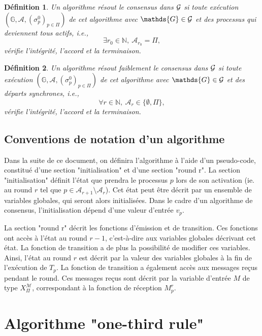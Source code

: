 \documentclass{article}
\newtheorem{definition}{Définition}
\begin{document}
\begin{definition}\label{def:res}
	Un algorithme \emph{résout  le consensus dans ${\cal G}$} si toute exécution 
	$( \mathds{G} ,  \mathcal{A} , (\sigma^0_p)_{p \in \Pi})$     de cet algorithme  avec
	$ \mathds{G} \in {\cal G}$  et des processus qui deviennent tous actifs, i.e., 
	$$ \exists r_0 \in \mathds{N}, \  \mathcal{A}_{r_0}  = \Pi ,$$ 
	vérifie l'intégrité, l'accord et la terminaison.
\end{definition}

\begin{definition}\label{def:faible}
	Un algorithme \emph{résout faiblement le consensus dans ${\cal G}$} si toute exécution 
	$( \mathds{G} ,  \mathcal{A} , (\sigma^0_p)_{p \in \Pi})$     de cet algorithme  avec
	$ \mathds{G} \in {\cal G}$  et des d\'eparts synchrones, i.e., 
	$$ \forall r \in \mathds{N}, \  \mathcal{A}_r \in \{\emptyset, \Pi\}  ,$$ 
	vérifie l'intégrité, l'accord et la terminaison.
\end{definition}

\subsection{Conventions de notation d'un algorithme}

Dans la suite de ce document, on définira l'algorithme à l'aide d'un pseudo-code, constitué d'une section "initialisation" et d'une section "round r".
La section "initialisation" définit l'état que prendra le processus $p$ lors de son activation
(ie. au round $r$ tel que $p \in \mathcal{A}_{r+1} \setminus \mathcal{A}_r$).
Cet état peut être décrit par un ensemble de variables globales, qui seront alors initialisées.
Dans le cadre d'un algorithme de consensus, l'initialisation dépend d'une valeur d'entrée $v_p$.

La section "round r" décrit les fonctions d'émission et de transition. Ces fonctions ont accès à l'état au round $r-1$, c'est-à-dire aux
variables globales décrivant cet état.
La fonction de transition a de plus la possibilité de modifier ces variables. Ainsi, l'état au round $r$ est décrit par la valeur des variables globales
à la fin de l'exécution de $T_p$.
La fonction de transition a également accès aux messages reçus pendant le round. Ces messages reçus sont décrit par la variable d'entrée
$M$ de type $X_\Pi^\mathcal{M}$, correspondant à la fonction de réception $M^r_p$.

\section{Algorithme "one-third rule"}
\end{document}
